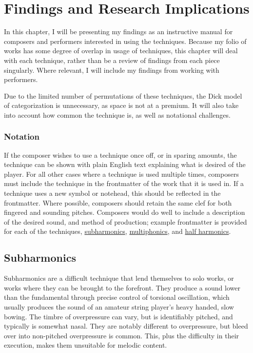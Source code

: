 
\chapter{Findings and Research Implications}\label{ch:chapter4}
In this chapter, I will be presenting my findings as an instructive manual for composers and performers interested in using the techniques.
Because my folio of works has some degree of overlap in usage of techniques, this chapter will deal with each technique, rather than be a review of findings from each piece singularly.
Where relevant, I will include my findings from working with performers.

Due to the limited number of permutations of these techniques, the Dick model of categorization is unnecessary, as space is not at a premium.\autocite{dickOtherFlute1989} 
It will also take into account how common the technique is, as well as notational challenges.

\subsection{Notation}
If the composer wishes to use a technique once off, or in sparing amounts, the technique can be shown with plain English text explaining what is desired of the player.\autocite[494]{gouldBars2011}
For all other cases where a technique is used multiple times, composers must include the technique in the frontmatter of the work that it is used in.\autocite[494]{gouldBars2011}
If a technique uses a new symbol or notehead, this should be reflected in the frontmatter.
Where possible, composers should retain the same clef for both fingered and sounding pitches.\autocite[422]{gouldBars2011}
Composers would do well to include a description of the desired sound, and method of production; example frontmatter is provided for each of the techniques, \hyperref[sec:subharmonicFrontmatter]{subharmonics}, \hyperref[sec:multiphonicFrontmatter]{multiphonics}, and \hyperref[sec:halfHarmonicFrontmatter]{half harmonics}. 


\section{Subharmonics}\label{sec:subharmonics}
Subharmonics are a difficult technique that lend themselves to solo works, or works where they can be brought to the forefront.
They produce a sound lower than the fundamental through precise control of torsional oscillation, which usually produces the sound of an amateur string player's heavy handed, slow bowing. 
The timbre of overpressure can vary, but is identifiably pitched, and typically is somewhat nasal.
They are notably different to overpressure, but bleed over into non-pitched overpressure is common.
This, plus the difficulty in their execution, makes them unsuitable for melodic content.

